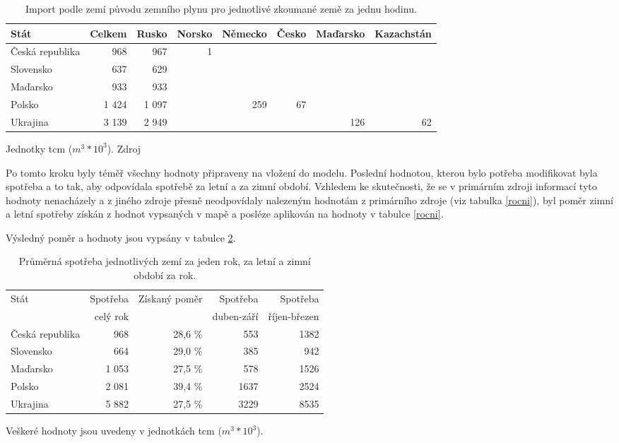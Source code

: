 \documentclass[a4paper,11pt]{article}
\begin{document}
\begin{table}[h!]
\begin{center}
\begin{tabular}{|l|r|r|r|r|r|r|r|}
    \hline
    Stát 			& Celkem	& Rusko & Norsko & Německo 	& Česko & Maďarsko & Kazachstán\\
    \hline 
    Česká republika	& 968		& 967	& 1		& 		&			&		&\\ 
    Slovensko 		& 637		& 629	& 		& 		&			&		&\\
    Maďarsko 		& 933		& 933 	&		&		&			&		&\\
    Polsko 			& 1 424	 	& 1 097 	& 		& 259	& 67			&		&\\
    Ukrajina 		& 3 139		& 2 949	& 		&		&			& 126	& 62\\ \hline
\end{tabular}
\caption{Import podle zemí původu  zemního plynu pro jednotlivé zkoumané země za jednu hodinu.}
Jednotky tcm ($m^3 * 10^3$).  Zdroj \cite{IEA}
\label{importdeni}
\end{center}
\end{table}


Po tomto kroku byly téměř všechny hodnoty připraveny na vložení do modelu.
Poslední hodnotou, kterou bylo potřeba modifikovat byla spotřeba a to tak,
aby odpovídala spotřebě za letní a za zimní období.
Vzhledem ke skutečnosti, že se v primárním zdroji informací tyto hodnoty nenacházely
a z jiného zdroje přesně neodpovídaly nalezeným hodnotám z primárního zdroje
(viz tabulka \ref{rocni}),
byl poměr zimní a letní spotřeby získán z hodnot vypsaných v mapě \cite{Mapka staty}
a posléze aplikován na hodnoty v tabulce \ref{rocni}.

Výsledný poměr a hodnoty jsou vypsány v tabulce
\ref{spotreba}.

\begin{table}[h!]
\begin{center}
\begin{tabular}{|l|r|r|r|r|}
    \hline
    Stát 			& Spotřeba 	& Získaný poměr & Spotřeba  & Spotřeba \\
    					& celý rok 		&			& duben-září 	& říjen-březen\\
    \hline 
    Česká republika	& 968	& 28,6 \%   	& 553	& 1382\\ 
    Slovensko 		& 664	& 29,0 \%	& 385	& 942\\
    Maďarsko 		& 1 053	& 27,5 \% 	& 578	& 1526\\
    Polsko 			& 2 081	& 39,4 \%	& 1637	& 2524\\
    Ukrajina 		& 5 882	& 27,5 \%	& 3229	& 8535\\
    \hline
\end{tabular}
\caption{Průměrná spotřeba jednotlivých zemí za jeden rok, za letní a zimní období za rok.}
Veškeré hodnoty jsou uvedeny v jednotkách tcm ($m^3 * 10^3$).
\label{spotreba}
\end{center}
\end{table} 
\end{document}
